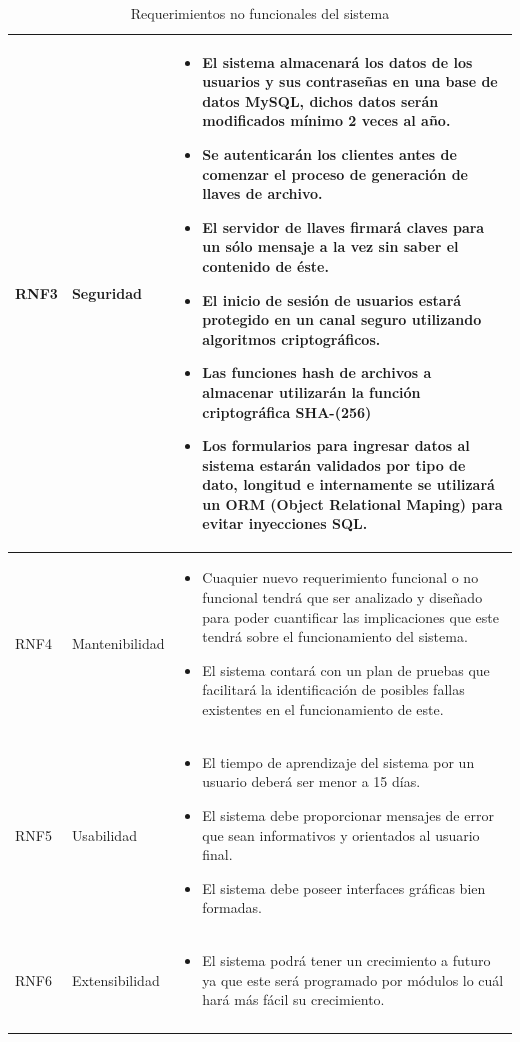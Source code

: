 \begin{longtable}{| p{1.5cm} | p{3cm} | p{11cm} |}
RNF3 & Seguridad & \begin{itemize} 
    \item El sistema almacenará los datos de los usuarios y sus contraseñas en una base de datos MySQL, dichos datos serán modificados mínimo 2  veces al año.  
   \item Se autenticarán los clientes antes de comenzar el proceso de generación de llaves de archivo. 
   \item El servidor de llaves firmará claves para un sólo mensaje a la vez sin saber el contenido de éste. 
   \item El inicio de sesión de usuarios estará protegido en un canal seguro utilizando algoritmos criptográficos. 
   \item Las funciones hash de archivos a almacenar utilizarán la función criptográfica SHA-(256)
   \item Los formularios para ingresar datos al sistema estarán validados por tipo de dato, longitud e internamente se utilizará un ORM (Object Relational Maping) para evitar inyecciones SQL. 
 \end{itemize}

\\ \hline 
RNF4 & Mantenibilidad & \begin{itemize}
   \item Cuaquier nuevo requerimiento funcional o no funcional tendrá que ser analizado y diseñado para poder cuantificar las implicaciones que este tendrá sobre el funcionamiento del sistema. 
   \item El sistema contará con un plan de pruebas que facilitará la identificación de posibles fallas existentes en el funcionamiento de este. 
 \end{itemize}

\\ \hline
RNF5 & Usabilidad & \begin{itemize}
   \item El tiempo de aprendizaje del sistema por un usuario deberá ser menor a 15 días. 
   \item El sistema debe proporcionar mensajes de error que sean informativos y orientados al usuario final. 
   \item El sistema debe poseer interfaces gráficas bien formadas.
 \end{itemize}

\\ \hline
RNF6 & Extensibilidad & \begin{itemize}
   \item El sistema podrá tener un crecimiento a futuro ya que este será programado por módulos lo cuál hará más fácil su crecimiento.
 \end{itemize}
\\ \hline
\caption{Requerimientos no funcionales del sistema}
\label{Requerimientos no funcionales }
\end{longtable}
